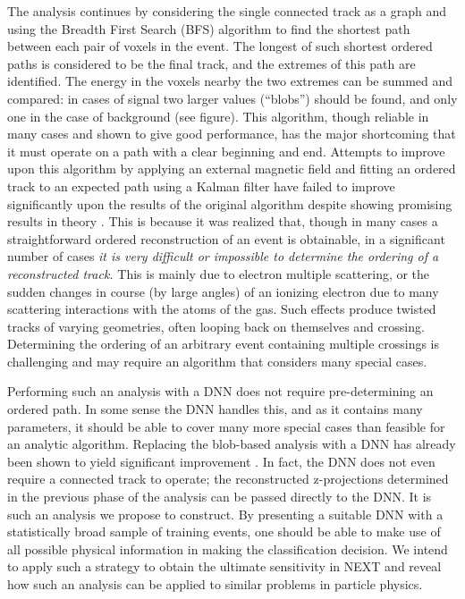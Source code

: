 \documentclass[11pt,a4paper]{article}
\begin{document}
The analysis continues by considering the single connected track as a graph and using the Breadth First Search (BFS) algorithm to find the shortest path between each pair of voxels in the event. The longest of such shortest ordered paths is considered to be the final track, and the extremes of this path are identified. The energy in the voxels nearby the two extremes can be summed and compared: in cases of signal two larger values (``blobs'') should be found, and only one in the case of background (see figure).  This algorithm, though reliable in many cases and shown to give good performance, has the major shortcoming that it must operate on a path with a clear beginning and end. Attempts to improve upon this algorithm by applying an external magnetic field and fitting an ordered track to an expected path using a Kalman filter have failed to improve significantly upon the results of the original algorithm despite showing promising results in theory \cite{NEXT_BFIELD}. This is because it was realized that, though in many cases a straightforward ordered reconstruction of an event is obtainable, in a significant number of cases \emph{it is very difficult or impossible to determine the ordering of a reconstructed track.}  This is mainly due to electron multiple scattering, or the sudden changes in course (by large angles) of an ionizing electron due to many scattering interactions with the atoms of the gas.  Such effects produce twisted tracks of varying geometries, often looping back on themselves and crossing. Determining the ordering of an arbitrary event containing multiple crossings is challenging and may require an algorithm that considers many special cases.

Performing such an analysis with a DNN does not require pre-determining an ordered path. In some sense the DNN handles this, and as it contains many parameters, it should be able to cover many more special cases than feasible for an analytic algorithm. Replacing the blob-based analysis with a DNN has already been shown to yield significant improvement \cite{NEXT_DNN}. In fact, the DNN does not even require a connected track to operate; the reconstructed z-projections determined in the previous phase of the analysis can be passed directly to the DNN. It is such an analysis we propose to construct. By presenting a suitable DNN with a statistically broad sample of training events, one should be able to make use of all possible physical information in making the classification decision. We intend to apply such a strategy to obtain the ultimate sensitivity in NEXT and reveal how such an analysis can be applied to similar problems in particle physics.
\end{document}
